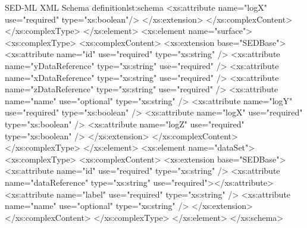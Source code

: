\begin{myXmlLst}{SED-ML XML Schema definition}{lst:schema}
			<xs:attribute name="logX" use="required" type="xs:boolean"/>
		</xs:extension>
		</xs:complexContent>
		</xs:complexType>
	</xs:element>
	<xs:element name="surface">
		<xs:complexType>
		<xs:complexContent>
		<xs:extension base="SEDBase">
			<xs:attribute name="id" use="required" type="xs:string" />
			<xs:attribute name="yDataReference" type="xs:string"
				use="required" />
			<xs:attribute name="xDataReference" type="xs:string"
				use="required" />
			<xs:attribute name="zDataReference" type="xs:string"
				use="required" />
			<xs:attribute name="name" use="optional" type="xs:string" />
			<xs:attribute name="logY" use="required" type="xs:boolean" />
			<xs:attribute name="logX" use="required" type="xs:boolean" />
			<xs:attribute name="logZ" use="required" type="xs:boolean" />
		</xs:extension>
		</xs:complexContent>
		</xs:complexType>
	</xs:element>
	<xs:element name="dataSet">
		<xs:complexType>
		<xs:complexContent>
		<xs:extension base="SEDBase">
			<xs:attribute name="id" use="required" type="xs:string" />
			<xs:attribute name="dataReference" type="xs:string" use="required"></xs:attribute>
			<xs:attribute name="label" use="required" type="xs:string" />
			<xs:attribute name="name" use="optional" type="xs:string" />
		</xs:extension>
		</xs:complexContent>
		</xs:complexType>
	</xs:element>
</xs:schema>
\end{myXmlLst}

